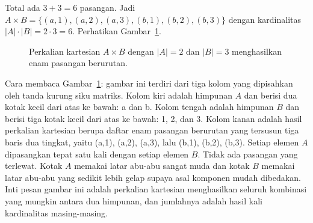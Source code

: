 \documentclass[11pt,a4paper]{article}
\begin{document}
Total ada $3+3=6$ pasangan. Jadi $A \times B=\{(a,1),(a,2),(a,3),(b,1),(b,2),(b,3)\}$ dengan kardinalitas $|A| \cdot |B|=2 \cdot 3=6$. Perhatikan Gambar~\ref{fig:kartesian}.

\begin{figure}[H]
	\centering
	\caption{Perkalian kartesian $A \times B$ dengan $|A|=2$ dan $|B|=3$ menghasilkan enam pasangan berurutan.}
	\label{fig:kartesian}
\end{figure}

Cara membaca Gambar~\ref{fig:kartesian}: gambar ini terdiri dari tiga kolom yang dipisahkan oleh tanda kurung siku matriks. Kolom kiri adalah himpunan $A$ dan berisi dua kotak kecil dari atas ke bawah: a dan b. Kolom tengah adalah himpunan $B$ dan berisi tiga kotak kecil dari atas ke bawah: 1, 2, dan 3. Kolom kanan adalah hasil perkalian kartesian berupa daftar enam pasangan berurutan yang tersusun tiga baris dua tingkat, yaitu (a,1), (a,2), (a,3), lalu (b,1), (b,2), (b,3). Setiap elemen $A$ dipasangkan tepat satu kali dengan setiap elemen $B$. Tidak ada pasangan yang terlewat. Kotak $A$ memakai latar abu-abu sangat muda dan kotak $B$ memakai latar abu-abu yang sedikit lebih gelap supaya asal komponen mudah dibedakan. Inti pesan gambar ini adalah perkalian kartesian menghasilkan seluruh kombinasi yang mungkin antara dua himpunan, dan jumlahnya adalah hasil kali kardinalitas masing-masing.
\end{document}
